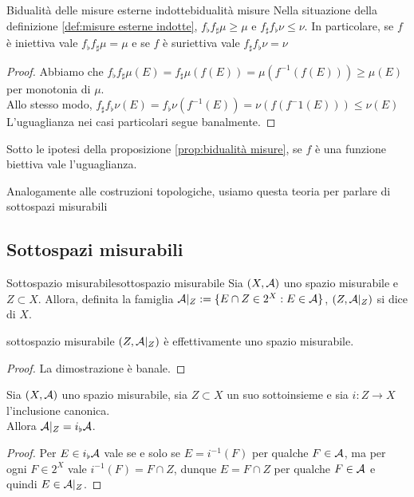 \documentclass{article}
\renewcommand\A{\mc{A}}
\begin{document}
\begin{proposition}{Bidualità delle misure esterne indotte}{bidualità misure}
    Nella situazione della definizione \ref{def:misure esterne indotte}, $f_\flat f_\sharp\mu \ge \mu$ e $f_\sharp f_\flat\nu \le \nu$. In particolare, se $f$ è iniettiva vale $f_\flat f_\sharp\mu = \mu$ e se $f$ è suriettiva vale $f_\sharp f_\flat\nu = \nu$
    \begin{proof}
        Abbiamo che $f_\flat f_\sharp\mu(E) = f_\sharp\mu(f(E)) = \mu(f^{-1}(f(E)))\ge \mu(E)$ per monotonia di $\mu$.\\
        Allo stesso modo, $f_\sharp f_\flat\nu(E) = f_\flat\nu(f^{-1}(E)) = \nu(f(f^-1(E))) \le \nu(E)$\\
        L'uguaglianza nei casi particolari segue banalmente.
    \end{proof}
\end{proposition}
\begin{corollary}{}{}
    Sotto le ipotesi della proposizione \ref{prop:bidualità misure}, se $f$ è una funzione biettiva vale l'uguaglianza.
\end{corollary}

Analogamente alle costruzioni topologiche, usiamo questa teoria per parlare di sottospazi misurabili

\subsection{Sottospazi misurabili}

\begin{definition}{Sottospazio misurabile}{sottospazio misurabile}
    Sia $(X,\A)$ uno spazio misurabile e $Z\subset X$. Allora, definita la famiglia $\A|_Z := \{E\cap Z \in 2^X : E\in \A\}$, $(Z, \A|_Z)$ si dice  di $X$.
\end{definition}
\begin{remark}{}{sottospazio misurabile}
    $(Z,\A|_Z)$ è effettivamente uno spazio misurabile.
    \begin{proof}
        La dimostrazione è banale.
    \end{proof}
\end{remark}

\begin{proposition}{}{}
    Sia $(X,\A)$ uno spazio misurabile, sia $Z\subset X$ un suo sottoinsieme e sia $i : Z \to X$ l'inclusione canonica.\\
    Allora $\A|_Z = i_\flat \A$.
    \begin{proof}
        Per $E \in i_\flat \A$ vale se e solo se $E = i^{-1}(F)$ per qualche $F \in \A$, ma per ogni $F \in 2^X$ vale $i^{-1}(F) = F \cap Z$, dunque $E = F\cap Z$ per qualche $F \in \A$ e quindi $E \in \A|_Z$.
    \end{proof}
\end{proposition}
\end{document}
